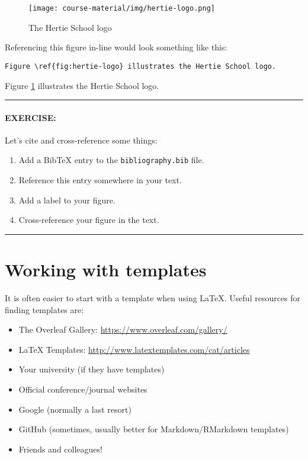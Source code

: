 \documentclass[11pt]{article}
\begin{document}
\begin{figure}[H]
    \centering
    \texttt{[image: course-material/img/hertie-logo.png]}
    \caption{The Hertie School logo}
    \label{fig:hertie-logo}
\end{figure}

\noindent Referencing this figure in-line would look something like this:

\begin{lstlisting}
Figure \ref{fig:hertie-logo} illustrates the Hertie School logo.
\end{lstlisting}

\noindent Figure \ref{fig:hertie-logo} illustrates the Hertie School logo.
\newpage
\hrule
\paragraph{EXERCISE:} Let's cite and cross-reference some things:
\begin{enumerate}[noitemsep]
    \item Add a BibTeX entry to the \verb|bibliography.bib| file.
    \item Reference this entry somewhere in your text.
    \item Add a label to your figure.
    \item Cross-reference your figure in the text.
\end{enumerate}
\vspace{0.7em}
\hrule

\section*{Working with templates}

It is often easier to start with a template when using {\LaTeX}. Useful resources for finding templates are:

\begin{itemize}[nolistsep,noitemsep]
    \item The Overleaf Gallery: \url{https://www.overleaf.com/gallery/}
    \item LaTeX Templates: \url{http://www.latextemplates.com/cat/articles}
    \item Your university (if they have templates)
    \item Official conference/journal websites
    \item Google (normally a last resort)
    \item GitHub (sometimes, usually better for Markdown/RMarkdown templates)
    \item Friends and colleagues!
\end{itemize}
\end{document}

